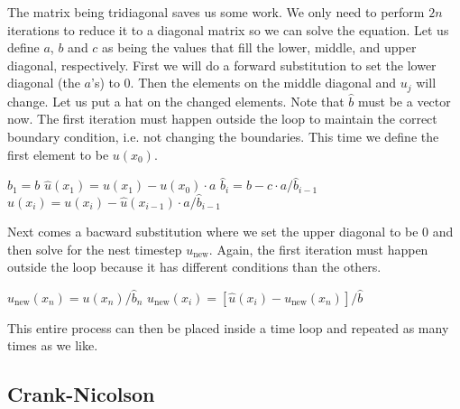 The matrix being tridiagonal saves us some work. We only need to perform $2n$ 
iterations to reduce it to a diagonal matrix so we can solve the equation. Let 
us define $a$, $b$ and $c$ as being the values that fill the lower, middle, and 
upper diagonal, respectively. First we will do a forward substitution to set 
the lower diagonal (the $a$'s) to $0$. Then the elements on the middle diagonal 
and $u_j$ will change. Let us put a hat on the changed elements. Note that 
$\hat{b}$ must be a vector now. The first iteration must happen outside the loop
to maintain the correct boundary condition, i.e. not changing the boundaries. 
This time we define the first element to be $u(x_0)$.
\begin{algorithmic}
    \State $ \hat{b}_1 = b $
    \State $ \hat{u}(x_1) = u(x_1) - u(x_0) \cdot a $
        \State $ \hat{b}_i
                 = b    - c \cdot a / \hat{b}_{i-1} $
        \State $ \hat{u}(x_i)
                 = u(x_i) - \hat{u}(x_{i-1}) \cdot a / \hat{b}_{i-1} $
    \EndFor
\end{algorithmic}
Next comes a bacward substitution where we set the upper diagonal to be $0$ and 
then solve for the nest timestep $u_\textrm{new}$. Again, the first iteration
must happen outside the loop because it has different conditions than the 
others.
\begin{algorithmic}
    \State $ u_\textrm{new}(x_n) = u(x_n) / \hat{b}_n $
        \State $ u_\textrm{new}(x_i)
                 = \left[ \hat{u}(x_i) - u_\textrm{new}(x_n) \right] / \hat{b} $
    \EndFor
\end{algorithmic}
This entire process can then be placed inside a time loop and repeated as many 
times as we like.



\subsection{Crank-Nicolson}

